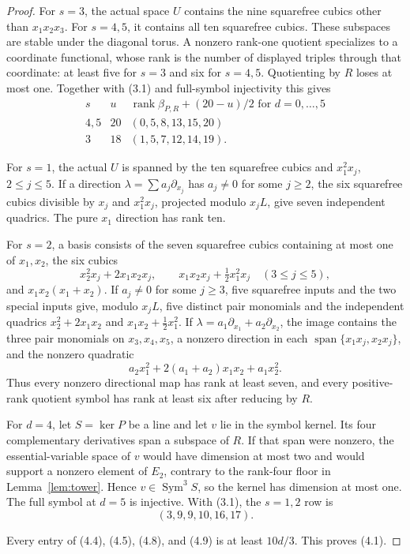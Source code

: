 \documentclass[11pt]{amsart}
\newcommand{\Sym}{\operatorname{Sym}}
\newcommand{\Span}{\operatorname{span}}
\newcommand{\rank}{\operatorname{rank}}
\theoremstyle{definition}
\begin{document}
\begin{proof}
For \(s=3\), the actual space \(U\) contains the nine squarefree cubics
other than \(x_1x_2x_3\). For \(s=4,5\), it contains all ten squarefree
cubics. These subspaces are stable under the diagonal torus. A nonzero
rank-one quotient specializes to a coordinate functional, whose rank is the
number of displayed triples through that coordinate: at least five for
\(s=3\) and six for \(s=4,5\). Quotienting by \(R\) loses at most one.
Together with (3.1) and full-symbol injectivity this gives
\[
\begin{array}{c|c|c}
s&u&\rank\beta_{P,R}+(20-u)/2\text{ for }d=0,\ldots,5\\ \hline
4,5&20&(0,5,8,13,15,20)\\
3&18&(1,5,7,12,14,19).
\end{array} \tag{4.8}
\]

For \(s=1\), the actual \(U\) is spanned by the ten squarefree cubics and
\(x_1^2x_j\), \(2\le j\le5\). If a direction
\(\lambda=\sum a_j\partial_{x_j}\) has \(a_j\ne0\) for some \(j\ge2\),
the six squarefree cubics divisible by \(x_j\) and \(x_1^2x_j\), projected
modulo \(x_jL\), give seven independent quadrics. The pure \(x_1\)
direction has rank ten.

For \(s=2\), a basis consists of the seven squarefree cubics containing at
most one of \(x_1,x_2\), the six cubics
\[
 x_2^2x_j+2x_1x_2x_j,\qquad
 x_1x_2x_j+\tfrac12x_1^2x_j\quad(3\le j\le5),
\]
and \(x_1x_2(x_1+x_2)\). If \(a_j\ne0\) for some \(j\ge3\), five
squarefree inputs and the two special inputs give, modulo \(x_jL\), five
distinct pair monomials and the independent quadrics
\(x_2^2+2x_1x_2\) and \(x_1x_2+\tfrac12x_1^2\). If
\(\lambda=a_1\partial_{x_1}+a_2\partial_{x_2}\), the image contains the
three pair monomials on \(x_3,x_4,x_5\), a nonzero direction in each
\(\Span\{x_1x_j,x_2x_j\}\), and the nonzero quadratic
\[
 a_2x_1^2+2(a_1+a_2)x_1x_2+a_1x_2^2.
\]
Thus every nonzero directional map has rank at least seven, and every
positive-rank quotient symbol has rank at least six after reducing by \(R\).

For \(d=4\), let \(S=\ker P\) be a line and let \(v\) lie in the symbol
kernel. Its four complementary derivatives span a subspace of \(R\). If
that span were nonzero, the essential-variable space of \(v\) would have
dimension at most two and would support a nonzero element of \(E_2\),
contrary to the rank-four floor in Lemma~\ref{lem:tower}. Hence
\(v\in\Sym^3S\), so the kernel has dimension at most one. The full symbol at
\(d=5\) is injective. With (3.1), the \(s=1,2\) row is
\[
 (3,9,9,10,16,17). \tag{4.9}
\]

Every entry of (4.4), (4.5), (4.8), and (4.9) is at least \(10d/3\).
This proves (4.1).
\end{proof}
\end{document}
